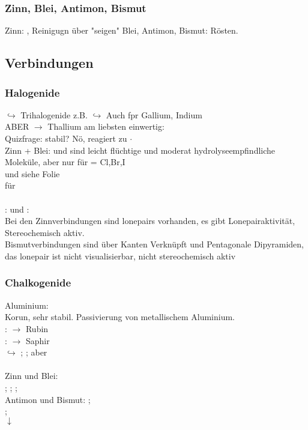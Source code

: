 \documentclass{article}
\begin{document}
\subsubsection{Zinn, Blei, Antimon, Bismut}
Zinn: , Reinigugn über "seigen"
Blei, Antimon, Bismut: Rösten.

\subsection{Verbindungen}
\subsubsection{Halogenide}
$\hookrightarrow$ Trihalogenide z.B. 
$\hookrightarrow$ Auch fpr Gallium, Indium\\
ABER $\rightarrow$ Thallium am liebsten einwertig: \\
Quizfrage:  stabil? Nö, reagiert zu  $\cdot$ \\
Zinn + Blei:  und  sind leicht flüchtige und moderat hydrolyseempfindliche Moleküle, aber nur für  = Cl,Br,I\\
 und  siehe Folie\\
für \\
\\
:   und :\\
Bei den Zinnverbindungen sind lonepairs vorhanden, es gibt Lonepairaktivität, Stereochemisch aktiv.\\
Bismutverbindungen sind über Kanten Verknüpft und Pentagonale Dipyramiden, das lonepair ist nicht visualisierbar, nicht stereochemisch aktiv\\

\subsubsection{Chalkogenide}
Aluminium: \\
Korun, sehr stabil. Passivierung von metallischem Aluminium.\\
: $\rightarrow$ Rubin\\
: $\rightarrow$ Saphir\\
$\hookrightarrow$ ; ; aber \\\\
Zinn und Blei:\\
 ;  ;  ; \\
Antimon und Bismut:
; \\
; \\
$\downarrow$\\
\end{document}
